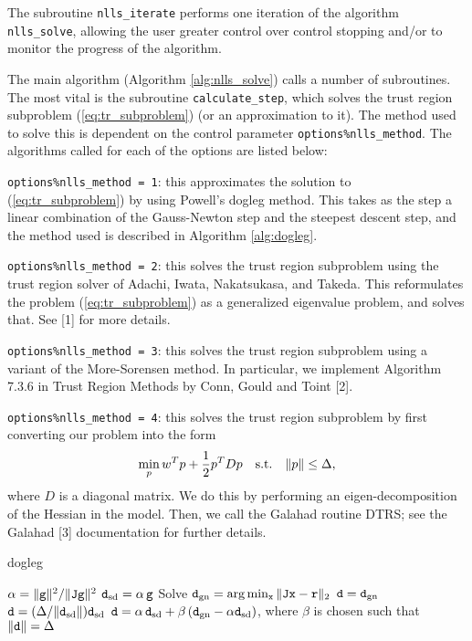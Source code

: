The subroutine \texttt{nlls\_iterate} performs one iteration of the algorithm
\texttt{nlls\_solve}, allowing the user greater control over control stopping and/or to monitor the progress of the algorithm.

The main algorithm (Algorithm \ref{alg:nlls_solve}) calls a number of subroutines.  
The most vital is the subroutine {\tt calculate\_step}, which solves the trust region 
subproblem (\ref{eq:tr_subproblem}) (or an approximation to it). The method used to solve
this is dependent on the control parameter {\tt options\%nlls\_method}. The algorithms called for each of the options are listed below:
\begin{description}
\item {\tt options\%nlls\_method = 1}: this approximates the solution to (\ref{eq:tr_subproblem}) by using Powell's dogleg method.  This takes as the step a linear combination of the Gauss-Newton step and the steepest descent step, and the method used is described in Algorithm \ref{alg:dogleg}.
\item {\tt options\%nlls\_method = 2}: this solves the trust region subproblem using the trust region solver of  Adachi, Iwata, Nakatsukasa, and Takeda.  This reformulates the 
problem (\ref{eq:tr_subproblem}) as a generalized eigenvalue problem, and solves that.  See
[1] for more details.
\item {\tt options\%nlls\_method = 3}: this solves the trust region subproblem using 
a variant of the More-Sorensen method.  In particular, we implement Algorithm 7.3.6
 in Trust Region Methods by Conn, Gould and Toint [2].
\item {\tt options\%nlls\_method = 4}: this solves the trust region subproblem by first 
converting our problem into the form
$$\min_p w^T p + \frac{1}{2} p^T D p \quad {\rm s.t.} \quad \|p\| \leq \Delta,$$
where $D$ is a diagonal matrix.  We do this by performing an eigen-decomposition of 
the Hessian in the model.  Then, we call the {\sc Galahad} routine {\sc DTRS}; see 
the {\sc Galahad} [3] documentation for further details.
\end{description}

\begin{algorithm}
\caption{dogleg}
\label{alg:dogleg}
  \begin{algorithmic}[1]
     
        \State $\alpha = \|{\tt g}\|^2 / \|{\tt J}{\tt g}\|^2$
        \State ${\tt d}_{\rm sd} = \alpha \,{\tt g}$
        \State Solve ${\tt d}_{\rm gn} = \arg \min_{{\tt x}}\|{\tt J} {\tt x}- {\tt r}\|_2$
        \State ${\tt d} = {\tt d}_{\rm gn}$
        \State ${\tt d} = (\Delta / \|{\tt d}_{\rm sd}\|) {\tt d}_{\rm sd}$
        \Else
        \State ${\tt d} = \alpha \, {\tt d}_{\rm sd} + \beta\, ({\tt d}_{\rm gn} - \alpha {\tt d}_{\rm sd})$, where $\beta$ is chosen such that $\|{\tt d}\| = \Delta$
        \EndIf
  \end{algorithmic}
\end{algorithm}

